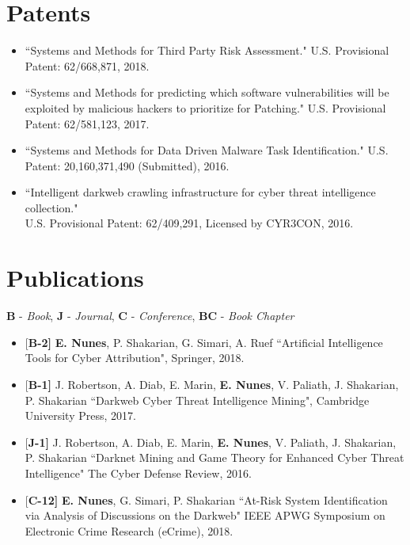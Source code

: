 \documentclass[margin,line]{CV}
\begin{document}
\begin{resume}
\section{\sc Patents}
\begin{itemize}[leftmargin =*]
	
\item ``Systems and Methods for Third Party Risk Assessment." U.S. Provisional Patent: 62/668,871, 2018.

\item ``Systems and Methods for predicting which software vulnerabilities will be exploited by malicious hackers to prioritize for Patching." U.S. Provisional Patent: 62/581,123, 2017.

\item ``Systems and Methods for Data Driven Malware Task Identification." U.S. Patent: 20,160,371,490 (Submitted), 2016. 

\item ``Intelligent darkweb crawling infrastructure for cyber threat intelligence collection."\\U.S. Provisional Patent: 62/409,291, Licensed by CYR3CON, 2016.
\end{itemize}


\section{\sc Publications}
{\bf *B} - {\em Book}, {\bf*J} - {\em Journal}, {\bf *C} - {\em Conference}, {\bf*BC} - {\em Book Chapter}\\

\begin{itemize}[leftmargin =*]

\item {[\bf B-2]}  {\bf E. Nunes}, P. Shakarian, G. Simari, A. Ruef ``Artificial Intelligence Tools for Cyber Attribution", Springer, 2018. 

\item {[\bf B-1]} J. Robertson, A. Diab, E. Marin, {\bf E. Nunes}, V. Paliath, J. Shakarian, P. Shakarian ``Darkweb Cyber Threat Intelligence Mining", Cambridge University Press, 2017. 

\item {[\bf J-1]} J. Robertson, A. Diab, E. Marin, {\bf E. Nunes}, V. Paliath, J. Shakarian, P. Shakarian ``Darknet Mining and Game Theory for Enhanced Cyber Threat Intelligence" The Cyber Defense Review, 2016.

\item {[\bf C-12]} {\bf E. Nunes}, G. Simari, P. Shakarian  ``At-Risk System Identification via Analysis of Discussions on the Darkweb" IEEE APWG Symposium on Electronic Crime Research (eCrime), 2018.


\end{itemize}
\end{resume}
\end{document}
